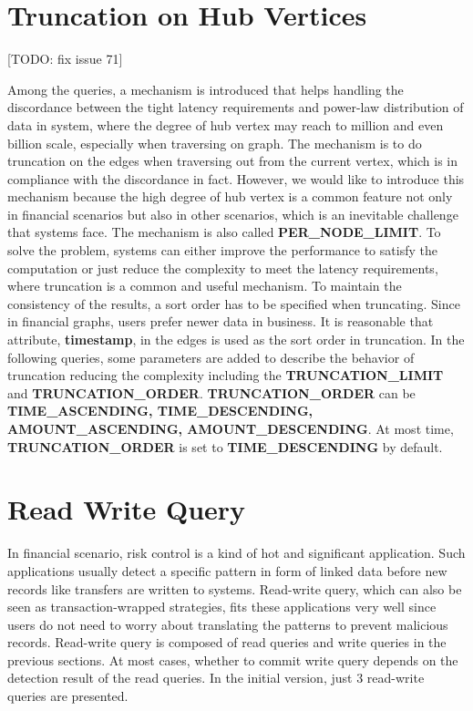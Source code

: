 
\section{Truncation on Hub Vertices}
[TODO: fix issue 71]

Among the queries, a mechanism is introduced that helps handling the discordance
between the tight latency requirements
and power-law distribution of data in system, where the degree of hub vertex may
reach to million and even billion scale, especially when traversing on graph.
The mechanism is to do truncation on the edges when traversing out from the
current vertex, which is in compliance with the discordance in fact. However, we
would like to introduce this mechanism because the high degree of hub vertex is
a common feature not only in financial scenarios but also in other scenarios,
which is an inevitable challenge that systems face. The mechanism is also called
\textbf{PER\_NODE\_LIMIT}. To solve the problem, systems can either
improve the performance to satisfy the computation or just reduce the
complexity to meet the latency requirements, where truncation is a common and
useful mechanism. To maintain the consistency of the results, a sort order has
to be specified when truncating. Since in financial graphs, users prefer newer
data in business. It is reasonable that attribute, \textbf{timestamp}, in the
edges is used as the sort order in truncation. In the following queries, some
parameters are added to describe the behavior of truncation reducing the
complexity including the \textbf{TRUNCATION\_LIMIT} and \textbf{TRUNCATION\_ORDER}.
\textbf{TRUNCATION\_ORDER} can be \textbf{TIME\_ASCENDING, TIME\_DESCENDING,
AMOUNT\_ASCENDING, AMOUNT\_DESCENDING}. At most time, \textbf{TRUNCATION\_ORDER}
is set to \textbf{TIME\_DESCENDING} by default.


\section{Read Write Query}

In financial scenario, risk control is a kind of hot and significant application.
Such applications usually detect a specific pattern in form of linked data before
new records like transfers are written to systems. Read-write query, which can also
be seen as transaction-wrapped strategies, fits these applications very well since
users do not need to worry about translating the patterns to prevent malicious records.
Read-write query is composed of read queries and write queries in the previous sections.
At most cases, whether to commit write query depends on the detection result of the
read queries. In the initial version, just 3 read-write queries are presented.